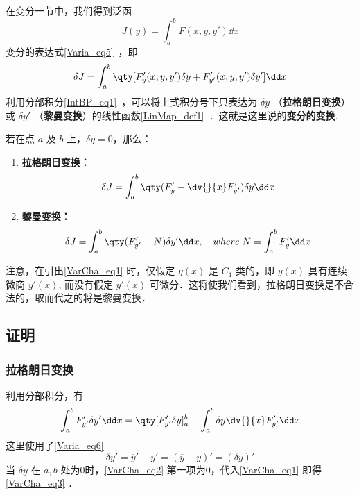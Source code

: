 
在变分一节中，我们得到泛函 
\begin{equation}
J(y)=\int_a^bF(x,y,y')\dd x
\end{equation}
变分的表达式\autoref{Varia_eq5}~，即
\begin{equation}\label{VarCha_eq1}
\delta J=\int_a^b\qty[F'_y(x,y,y')\delta y+F'_{y'}(x,y,y')\delta y']\dd x
\end{equation}
利用分部积分\autoref{IntBP_eq1}~，可以将上式积分号下只表达为 $\delta y$ （\textbf{拉格朗日变换}）或 $\delta y'$ （\textbf{黎曼变换}）的线性函数\autoref{LinMap_def1}~．这就是这里说的\textbf{变分的变换}.

若在点 $a$ 及 $b$ 上，$\delta y=0$，那么：
\begin{enumerate}
\item \textbf{拉格朗日变换：}
\begin{equation}\label{VarCha_eq3}
\delta J=\int_a^b\qty(F'_y-\dv{}{x}F'_{y'})\delta y\dd x
\end{equation}
\item \textbf{黎曼变换：}
\begin{equation}\label{VarCha_eq4}
\delta J=\int_a^b\qty(F'_{y'}-N)\delta y'\dd x ,\quad where \;N=\int_a^bF'_y\dd x
\end{equation}
\end{enumerate}


注意，在引出\autoref{VarCha_eq1} 时，仅假定 $y(x)$ 是 $C_1$ 类的，即 $y(x)$ 具有连续微商 $y'(x)$, 而没有假定 $y'(x)$ 可微分．这将使我们看到，拉格朗日变换是不合法的，取而代之的将是黎曼变换． 

\subsection{证明}
\subsubsection{拉格朗日变换}
利用分部积分，有
\begin{equation}\label{VarCha_eq2}
\int_a^bF'_{y'}\delta y'\dd x=\qty[F'_{y'}\delta y]_a^b-\int_a^b\delta y\dv{}{x}F'_{y'}\dd x
\end{equation}
这里使用了\autoref{Varia_eq6}~
\begin{equation}
\delta y'=\overline{y}'-y'=(\overline{y}-y)'=(\delta y)'
\end{equation}
当 $\delta y$ 在 $a,b$ 处为0时，\autoref{VarCha_eq2} 第一项为0，代入\autoref{VarCha_eq1} 即得\autoref{VarCha_eq3} ．

